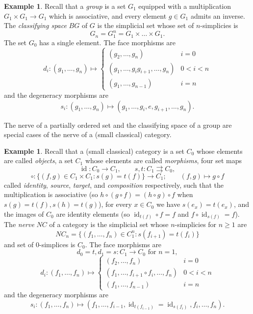 \documentclass[a4paper]{amsart}
\numberwithin{figure}{section}
\theoremstyle{theorem}
\theoremstyle{definition}
\newtheorem{exam}[thm]{Example}
\DeclareMathOperator{\id}{id}
\begin{document}
\begin{exam} \label{exam:bg}
Recall that a \emph{group} is a set $G_1$ equipped with a multiplication $G_1 \times G_1 \to G_1$ which is associative, and every element $g \in G_1$ admits an inverse. The \emph{classifying space} $BG$ of $G$ is the simplicial set whose set of $n$-simplicies is 
\[ G_n = G_1^n = G_1 \times \dots \times G_1. \]
The set $G_0$ has a single element. The face morphisms are 
\[ d_i: (g_1, \dots, g_n) \mapsto \left \{ \begin{array}{cc}
(g_2, \dots, g_n) & i = 0 \\
(g_1, \dots, g_ig_{i+1}, \dots, g_n) & 0 < i < n \\
(g_1, \dots, g_{n-1}) & i = n
\end{array} \right . \]
and the degeneracy morphisms are
\[ s_i: (g_1, \dots, g_n) \mapsto (g_1, \dots, g_i, e, g_{i+1}, \dots, g_n). \]
\end{exam}

The nerve of a partially ordered set and the classifying space of a group are special cases of the nerve of a (small classical) category.

\begin{exam} \label{exam:nc}
Recall that a (small classical) category is a set $C_0$ whose elements are called \emph{objects}, a set $C_1$ whose elements are called \emph{morphisms}, four set maps 
\[ \id: C_0 \to C_1, \qquad s, t: C_1 \rightrightarrows C_0, \]
\[ \circ: \{ (f, g) \in C_1 \times C_1 : s(g) = t(f) \} \to C_1; \qquad (f,g) \mapsto g \circ f \]
called \emph{identity}, \emph{source}, \emph{target}, and \emph{composition} respectively, such that the multiplication is associative (so $h\circ(g\circ f) = (h \circ g) \circ f$ when $s(g) = t(f), s(h) = t(g)$), for every $x \in C_0$ we have $s(e_x) = t(e_x)$, and the images of $C_0$ are identity elements (so $\id_{t(f)} \circ f = f$ and $f \circ \id_{s(f)} = f$). The \emph{nerve} $NC$ of a category is the simplicial set whose $n$-simplicies for $n \geq 1$ are 
\[ NC_n = \{ (f_1, \dots, f_n) \in C_1^n : s(f_{i{+}1}) = t(f_i) \} \]
and set of $0$-simplices is $C_0$. The face morphisms are
\[ d_0 = t, d_1 = s: C_1 \to C_0 \textrm{ for } n = 1, \]
\[ d_i: (f_1, \dots, f_n) \mapsto \left \{ \begin{array}{cc}
(f_2, \dots, f_n) & i = 0 \\
(f_1, \dots, f_{i+1} \circ f_i, \dots, f_n) & 0 < i < n \\
(f_1, \dots, f_{n-1}) & i = n
\end{array} \right . \]
and the degeneracy morphisms are 
\[ s_i: (f_1, \dots, f_n) \mapsto (f_1, \dots, f_{i-1}, \id_{t(f_{i{-}1})} = \id_{s(f_i)}, f_i, \dots, f_n). \]
\end{exam}
\end{document}
